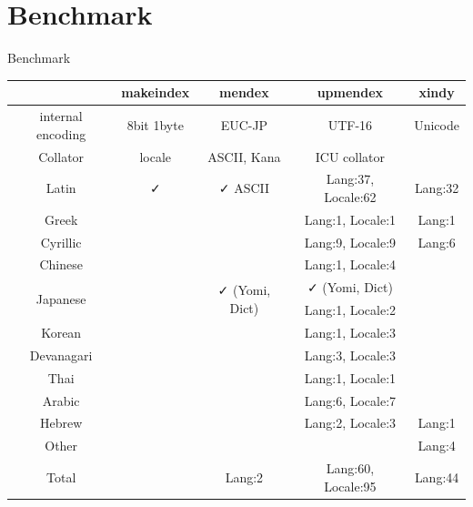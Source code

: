 \documentclass[aspectratio=169,10pt]{beamer}
\begin{document}

\section{Benchmark}
\begin{frame}{Benchmark}

\begin{center}
\footnotesize
\begin{tabular}{c|c|c|c|c}
            & makeindex & mendex      & upmendex            & xindy   \\\hline\hline
internal encoding & 8bit 1byte & EUC-JP    & UTF-16         & Unicode \\
Collator    & locale    & ASCII, Kana & ICU collator        &         \\\hline
Latin       & ✓        & ✓ ASCII    & Lang:37, Locale:62  & Lang:32 \\
Greek       &           &             & Lang:1, Locale:1    & Lang:1 \\
Cyrillic    &           &             & Lang:9, Locale:9    & Lang:6 \\\hdashline
Chinese     &           &             & Lang:1, Locale:4    &  \\
\multirow{2}{*}{Japanese} & & \multirow{2}{*}{✓ (Yomi, Dict)} & ✓ (Yomi, Dict) & \\
            &           &             & Lang:1, Locale:2    & \\
Korean      &           &             & Lang:1, Locale:3    & \\\hdashline
Devanagari  &           &             & Lang:3, Locale:3    & \\
Thai        &           &             & Lang:1, Locale:1    & \\
Arabic      &           &             & Lang:6, Locale:7    & \\
Hebrew      &           &             & Lang:2, Locale:3    & Lang:1  \\\hdashline
Other       &           &             &                     & Lang:4  \\\hline
Total       &           & Lang:2      & Lang:60, Locale:95  & Lang:44 \\\hline
\end{tabular}
\end{center}

\end{frame}

\end{document}
